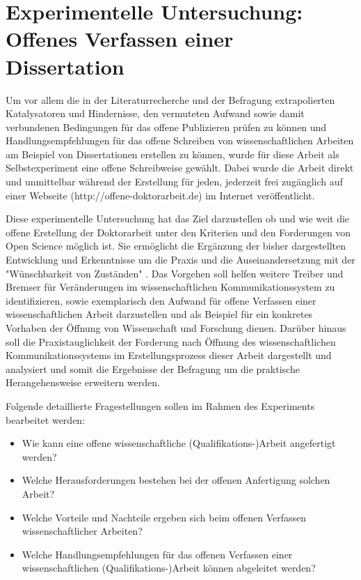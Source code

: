 \chapter{Experimentelle Untersuchung: Offenes Verfassen einer Dissertation}

Um vor allem die in der Literaturrecherche und der Befragung extrapolierten Katalysatoren und Hindernisse, den vermuteten Aufwand sowie damit verbundenen Bedingungen für das offene Publizieren prüfen zu können und Handlungsempfehlungen für das offene Schreiben von wissenschaftlichen Arbeiten am Beispiel von Dissertationen erstellen zu können, wurde für diese Arbeit als Selbstexperiment eine offene Schreibweise gewählt. Dabei wurde die Arbeit direkt und unmittelbar während der Erstellung für jeden, jederzeit frei zugänglich auf einer Webseite (http://offene-doktorarbeit.de) im Internet veröffentlicht.

Diese experimentelle Untersuchung hat das Ziel darzustellen ob und wie weit die offene Erstellung der Doktorarbeit unter den Kriterien und den Forderungen von Open Science möglich ist. Sie ermöglicht die Ergänzung der bisher dargestellten Entwicklung und Erkenntnisse um die Praxis und die Auseinandersetzung mit der "Wünschbarkeit von Zuständen" \cite{cite:10}. Das Vorgehen soll helfen weitere Treiber und Bremser für Veränderungen im wissenschaftlichen Kommunikationssystem zu identifizieren, sowie exemplarisch den Aufwand für offene Verfassen einer wissenschaftlichen Arbeit darzustellen und als Beispiel für ein konkretes Vorhaben der Öffnung von Wissenschaft und Forschung dienen. Darüber hinaus soll die Praxistauglichkeit der Forderung nach Öffnung des wissenschaftlichen Kommunikationssystems im Erstellungsprozess dieser Arbeit dargestellt und analysiert und somit die Ergebnisse der Befragung um die praktische Herangehensweise erweitern werden.

Folgende detaillierte Fragestellungen sollen im Rahmen des Experiments bearbeitet werden:
\begin{itemize}
\item Wie kann eine offene wissenschaftliche (Qualifikations-)Arbeit angefertigt werden?
\item Welche Herausforderungen bestehen bei der offenen Anfertigung solchen Arbeit?
\item Welche Vorteile und Nachteile ergeben sich beim offenen Verfassen wissenschaftlicher Arbeiten?
\item Welche Handlungsempfehlungen für das offenen Verfassen einer wissenschaftlichen (Qualifikations-)Arbeit können abgeleitet werden?
\end{itemize}

